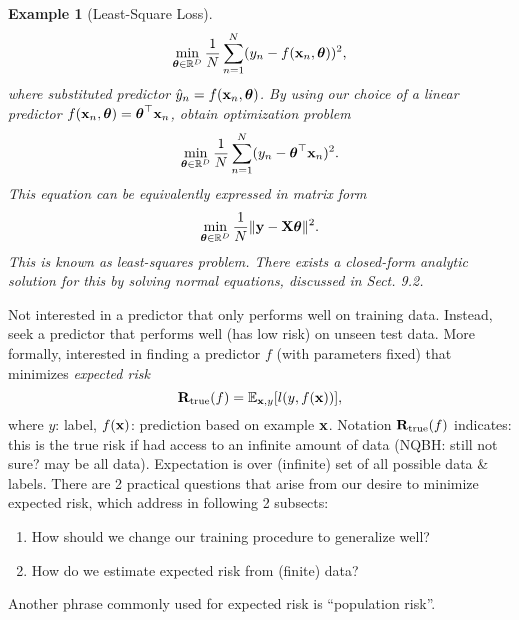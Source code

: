 \documentclass{article}
\newtheorem{example}{Example}
\begin{document}
\begin{itemize}
\begin{itemize}
\begin{itemize}
\begin{example}[Least-Square Loss]
				\begin{equation}
					\min_{\boldsymbol{\theta}\in\mathbb{R}^D} \frac{1}{N}\sum_{n=1}^N (y_n - f({\bf x}_n,\boldsymbol{\theta}))^2,
				\end{equation}
				where substituted predictor $\hat{y}_n = f({\bf x}_n,\boldsymbol{\theta})$. By using our choice of a linear predictor $f({\bf x}_n,\boldsymbol{\theta}) = \boldsymbol{\theta}^\top{\bf x}_n$, obtain optimization problem
				\begin{equation}
					\min_{\boldsymbol{\theta}\in\mathbb{R}^D} \frac{1}{N}\sum_{n=1}^N (y_n - \boldsymbol{\theta}^\top{\bf x}_n)^2.
				\end{equation}
				This equation can be equivalently expressed in matrix form
				\begin{equation}
					\min_{\boldsymbol{\theta}\in\mathbb{R}^D} \frac{1}{N}\|{\bf y} - {\bf X}\boldsymbol{\theta}\|^2.
				\end{equation}
				This is known as \emph{least-squares problem}. There exists a closed-form analytic solution for this by solving normal equations, discussed in Sect. 9.2.
			\end{example}
			Not interested in a predictor that only performs well on training data. Instead, seek a predictor that performs well (has low risk) on unseen test data. More formally, interested in finding a predictor $f$ (with parameters fixed) that minimizes {\it expected risk}
			\begin{equation}
				{\bf R}_{\rm true}(f) = \mathbb{E}_{{\bf x},y}[l(y,f({\bf x}))],
			\end{equation}
			where $y$: label, $f({\bf x})$: prediction based on example ${\bf x}$. Notation ${\bf R}_{\rm true}(f)$ indicates: this is the true risk if had access to an infinite amount of data (NQBH: still not sure? may be all data). Expectation is over (infinite) set of all possible data \& labels. There are 2 practical questions that arise from our desire to minimize expected risk, which address in following 2 subsects:
			\begin{enumerate}
				\item How should we change our training procedure to generalize well?
				\item How do we estimate expected risk from (finite) data?
			\end{enumerate}
			Another phrase commonly used for expected risk is ``population risk''.
			

\end{itemize}
\end{itemize}
\end{itemize}
\end{document}

